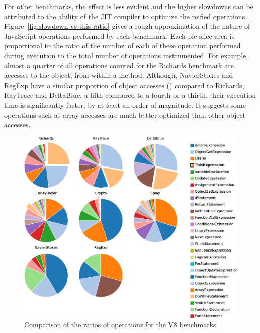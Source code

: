 For other benchmarks, the effect is less evident and the higher slowdowns can
be attributed to the ability of the JIT compiler to optimize the reified
operations.  Figure~\ref{fig:slowdown-vs-this-ratio} gives a rough
approximation of the nature of JavaScript operations performed by each
benchmark. Each pie slice area is proportional to the ratio of the number of
each of these operation performed during execution to the total number of
operations instrumented. For example, almost a quarter of all operations
counted for the Richards benchmark are accesses to the  object, from
within a method. Although, NavierStokes and RegExp have a similar proportion of
object accesses () compared to Richards, RayTrace and
DeltaBlue, a fifth compared to a fourth or a thirth, their execution time is
significantly faster, by at least an order of magnitude. It suggests some
operations such as array accesses are much better optimized than other object
accesses.

\begin{figure}[htbp]
\begin{center}
\includegraphics[width=.80\textwidth]{figures/benchmarkOperationRatios}
\caption[Ratios of operations for V8 benchmarks]{Comparison of the ratios of operations for the V8 benchmarks.}
\label{fig:operation-ratios}
\end{center}
\end{figure}


